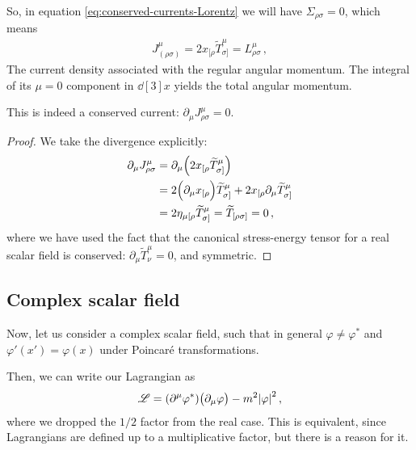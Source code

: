 \documentclass[main.tex]{subfiles}
\begin{document}
So, in equation \eqref{eq:conserved-currents-Lorentz} we will have \(\Sigma_{\rho \sigma } = 0\), which means 
%
\begin{align}
J^{\mu }_{(\rho \sigma )} = 2 x_{[\rho } \widetilde{T}^{\mu }_{\sigma ]} = L^{\mu }_{\rho \sigma }
\,,
\end{align}
%
The current density associated with the regular angular momentum. 
The integral of its \(\mu = 0\) component in \(\dd[3]{x}\) yields the total angular momentum. 

\begin{claim}
This is indeed a conserved current: \(\partial_{\mu } J^{\mu }_{\rho \sigma } = 0\). 
\end{claim}

\begin{proof}
We take the divergence explicitly: 
%
\begin{subequations}
\begin{align}
\partial_{\mu } J^{\mu }_{\rho \sigma } &= \partial_{\mu } \qty(2 x_{[\rho } \widetilde{T}^{\mu }_{\sigma ]})  \\
&= 2 \qty(\partial_{\mu } x_{[\rho } ) \widetilde{T}^{\mu }_{\sigma ]}
+ 2 x_{[\rho } \partial_{\mu } \widetilde{T}^{\mu }_{\sigma ]}   \\
&= 2 \eta_{\mu [\rho } \widetilde{T}^{\mu }_{\sigma ]} = \widetilde{T}_{[\rho \sigma ]} = 0 
\,,
\end{align}
\end{subequations}
%
where we have used the fact that the canonical stress-energy tensor for a real scalar field is conserved: \(\partial_{\mu } \widetilde{T}^{\mu }_{\nu } = 0\), and symmetric. 
\end{proof}

\subsection{Complex scalar field}

Now, let us consider a complex scalar field, such that in general \(\varphi \neq \varphi^{*}\) and \(\varphi ' (x') = \varphi (x)\) under Poincaré transformations.

Then, we can write our Lagrangian as 
%
\begin{align}
\mathscr{L} = \qty(\partial^{\mu } \varphi^{*}) \qty(\partial_{\mu } \varphi )
- m^2 \abs{\varphi }^2
\,,
\end{align}
%
where we dropped the \(1/2\) factor from the real case. 
This is equivalent, since Lagrangians are defined up to a multiplicative factor, but there is a reason for it. 
\end{document}
